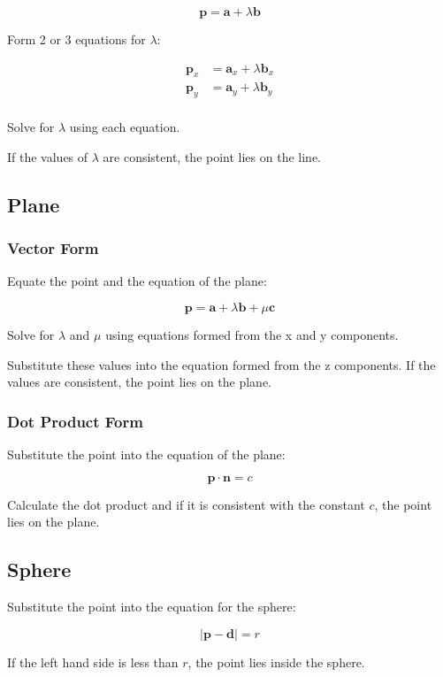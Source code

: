 \documentclass[a4paper,11pt]{article}
\newcommand{\bb}{\boldsymbol}
\begin{document}
$$
\bb{p} = \bb{a} + \lambda \bb{b}
$$

Form 2 or 3 equations for $\lambda$:

$$
\begin{aligned}
\bb{p}_x & = \bb{a}_x + \lambda \bb{b}_x \\
\bb{p}_y & = \bb{a}_y + \lambda \bb{b}_y \\
\end{aligned}
$$

Solve for $\lambda$ using each equation.

If the values of $\lambda$ are consistent, the point lies on the line.


\subsection{Plane}

\subsubsection{Vector Form}

Equate the point and the equation of the plane:

$$
\bb{p} = \bb{a} + \lambda \bb{b} + \mu \bb{c}
$$

Solve for $\lambda$ and $\mu$ using equations formed from the x and y
components.

Substitute these values into the equation formed from the z components. If the
values are consistent, the point lies on the plane.


\subsubsection{Dot Product Form}

Substitute the point into the equation of the plane:

$$
\bb{p} \cdot \bb{n} = c
$$

Calculate the dot product and if it is consistent with the constant $c$, the
point lies on the plane.


\subsection{Sphere}

Substitute the point into the equation for the sphere:

$$
\lvert \bb{p} - \bb{d} \rvert = r
$$

If the left hand side is less than $r$, the point lies inside the sphere.
\end{document}
